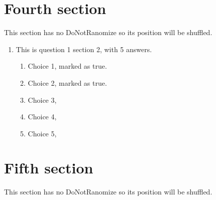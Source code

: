 \documentclass[a4paper,10pt]{article}%
\begin{document}
\section{Fourth section}
This section has no DoNotRanomize so its position will be shuffled.
\begin{enumerate}[resume]
	\item This is question 1 section 2, with 5 answers.
	\begin{enumerate}
		\item Choice 1, marked as true. %
		\item Choice 2, marked as true. %
		\item Choice 3, 
		\item Choice 4,
		\item Choice 5,
	\end{enumerate}
\end{enumerate}



\section{Fifth section}
This section has no DoNotRanomize so its position will be shuffled.
\end{document}
